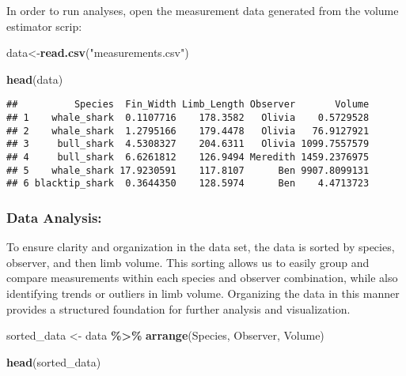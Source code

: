 \documentclass[
]{article}
\newenvironment{Shaded}{\begin{snugshade}}{\end{snugshade}}
\newcommand{\FunctionTok}[1]{\textcolor[rgb]{0.13,0.29,0.53}{\textbf{#1}}}
\newcommand{\NormalTok}[1]{#1}
\newcommand{\OtherTok}[1]{\textcolor[rgb]{0.56,0.35,0.01}{#1}}
\newcommand{\SpecialCharTok}[1]{\textcolor[rgb]{0.81,0.36,0.00}{\textbf{#1}}}
\newcommand{\StringTok}[1]{\textcolor[rgb]{0.31,0.60,0.02}{#1}}
\begin{document}
In order to run analyses, open the measurement data generated from the
volume estimator scrip:

\begin{Shaded}
\begin{Highlighting}[]
\NormalTok{data}\OtherTok{\textless{}{-}}\FunctionTok{read.csv}\NormalTok{(}\StringTok{"measurements.csv"}\NormalTok{)}
\end{Highlighting}
\end{Shaded}

\begin{Shaded}
\begin{Highlighting}[]
\FunctionTok{head}\NormalTok{(data)}
\end{Highlighting}
\end{Shaded}

\begin{verbatim}
##          Species  Fin_Width Limb_Length Observer       Volume
## 1    whale_shark  0.1107716    178.3582   Olivia    0.5729528
## 2    whale_shark  1.2795166    179.4478   Olivia   76.9127921
## 3     bull_shark  4.5308327    204.6311   Olivia 1099.7557579
## 4     bull_shark  6.6261812    126.9494 Meredith 1459.2376975
## 5    whale_shark 17.9230591    117.8107      Ben 9907.8099131
## 6 blacktip_shark  0.3644350    128.5974      Ben    4.4713723
\end{verbatim}

\subsubsection{Data Analysis:}\label{data-analysis}

To ensure clarity and organization in the data set, the data is sorted
by species, observer, and then limb volume. This sorting allows us to
easily group and compare measurements within each species and observer
combination, while also identifying trends or outliers in limb volume.
Organizing the data in this manner provides a structured foundation for
further analysis and visualization.

\begin{Shaded}
\begin{Highlighting}[]
\NormalTok{sorted\_data }\OtherTok{\textless{}{-}}\NormalTok{ data }\SpecialCharTok{\%\textgreater{}\%} \FunctionTok{arrange}\NormalTok{(Species, Observer, Volume)}
\end{Highlighting}
\end{Shaded}

\begin{Shaded}
\begin{Highlighting}[]
\FunctionTok{head}\NormalTok{(sorted\_data)}
\end{Highlighting}
\end{Shaded}
\end{document}
